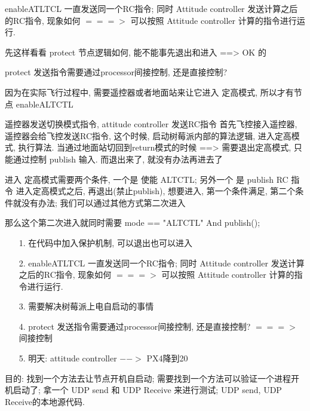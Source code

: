 enableATLTCL 一直发送同一个RC指令; 同时 Attitude controller 发送计算之后的RC指令, 现象如何 $===>$  可以按照 Attitude controller 计算的指令进行运行.

先这样看看 protect 节点逻辑如何, 能不能事先退出和进入 ==> OK 的

protect 发送指令需要通过processor间接控制, 还是直接控制?

因为在实际飞行过程中, 需要遥控器或者地面站来让它进入 定高模式, 所以才有节点 enableALTCTL

遥控器发送切换模式指令, attitude controller 发送RC指令
首先飞控接入遥控器, 遥控器会给飞控发送RC指令, 这个时候, 启动树莓派内部的算法逻辑, 进入定高模式, 执行算法. 
当通过地面站切回到return模式的时候  ==> 需要退出定高模式, 只能通过控制 publish 输入. 而退出来了, 就没有办法再进去了

进入 定高模式需要两个条件, 一个是 使能 ALTCTL; 另外一个 是 publish RC 指令
进入定高模式之后, 再退出(禁止publish), 想要进入, 第一个条件满足, 第二个条件就没有办法; 我们可以通过其他方式第二次进入 

那么这个第二次进入就同时需要 mode == "ALTCTL" And publish();

\par
\begin{itemize}
    \item [1.] 在代码中加入保护机制, 可以退出也可以进入
    \item [2.] enableATLTCL 一直发送同一个RC指令; 同时 Attitude controller 发送计算之后的RC指令, 现象如何 $===>$  可以按照 Attitude controller 计算的指令进行运行.
    \item [3.] 需要解决树莓派上电自启动的事情
    \item [4.] protect 发送指令需要通过processor间接控制, 还是直接控制?  $===>$ 间接控制
    \item [5.] 明天: attitude controller $-->$ PX4降到20
\end{itemize}

目的: 找到一个方法去让节点开机自启动; 
需要找到一个方法可以验证一个进程开机启动了; 
拿一个 UDP send 和 UDP Receive 来进行测试; 
UDP send, UDP Receive的本地源代码. 

